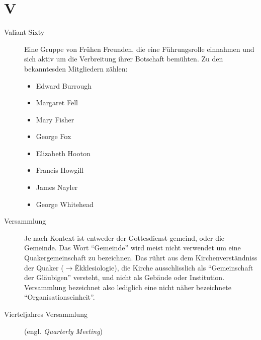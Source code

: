 \section*{V}

\articlesize

\begin{description}

 \item[Valiant Sixty] Eine Gruppe von Frühen Freunden, die eine Führungsrolle einnahmen und sich aktiv um die Verbreitung ihrer Botschaft bemühten. Zu den bekanntesden Mitgliedern zählen:
 
 \begin{itemize}
  \item Edward Burrough
  \item Margaret Fell
  \item Mary Fisher
  \item George Fox
  \item Elizabeth Hooton
  \item Francis Howgill
  \item James Nayler
  \item George Whitehead
 \end{itemize}

 \item[Versammlung] Je nach Kontext ist entweder der Gottesdienst gemeind, oder die Gemeinde. Das Wort "`Gemeinde"' wird meist nicht verwendet um eine Quakergemeinschaft zu bezeichnen. Das rührt aus dem Kirchenverständniss der Quaker ($\to$\~Ekklesiologie), die Kirche ausschlisslich als "`Gemeinschaft der Gläubigen"' versteht, und nicht als Gebäude oder Institution. Versammlung bezeichnet also lediglich eine nicht näher bezeichnete "`Organisationseinheit"'.

 \item[Vierteljahres Versammlung] (engl. \textit{Quarterly Meeting})
 
 \end{description}

\normalsize
